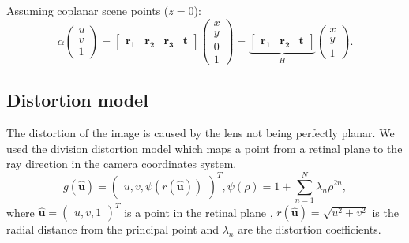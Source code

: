 \documentclass[
  twocolumn,
]{article} %
\begin{document}
Assuming coplanar scene points (\(z = 0\)):
\begin{equation*}
	\alpha \begin{pmatrix}
		u \\ v \\ 1
	\end{pmatrix} = \begin{bmatrix}
		\mathbf{r_1} & \mathbf{r_2} & \mathbf{r_3} & \mathbf{t}
	\end{bmatrix} \begin{pmatrix}
		x \\ y \\ 0 \\ 1
	\end{pmatrix} = \underbrace{\begin{bmatrix}
			\mathbf{r_1} & \mathbf{r_2} & \mathbf{t}
		\end{bmatrix}}_{H} \begin{pmatrix}
		x \\ y \\ 1
	\end{pmatrix}.
\end{equation*}

\subsection{Distortion model}
The distortion of the image is caused by the lens not being perfectly planar.
We used the division distortion model
\citep{fitzgibbonSimultaneousLinearEstimation2001} which maps a
point from a retinal plane to the
ray direction in the camera coordinates system.
\begin{equation*}
	g(\mathbf{\hat{u}}) = \begin{pmatrix}
		u, v, \psi(r(\mathbf{\hat{u}}))
	\end{pmatrix}^{T},
	\psi(\rho) = 1 + \sum_{n = 1}^{N} \lambda_n \rho^{2n},
\end{equation*}
where
\(\mathbf{\hat{u}} = \begin{pmatrix}
	u, v, 1
\end{pmatrix}^{T}\) is a point in the retinal plane
, \(r(\mathbf{\hat{u}}) = \sqrt{u^2 + v^2}\) is the radial distance from the
principal point and \(\lambda_n\) are the distortion coefficients.
\end{document}
